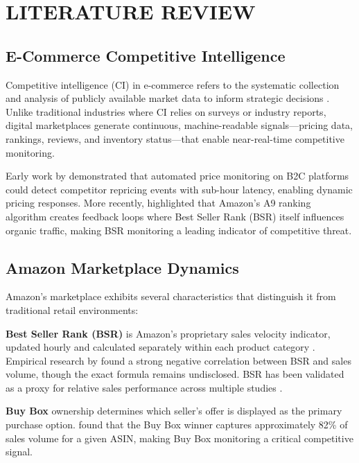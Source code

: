 \chapter{LITERATURE REVIEW}

\section{E-Commerce Competitive Intelligence}

Competitive intelligence (CI) in e-commerce refers to the systematic collection and
analysis of publicly available market data to inform strategic decisions \cite{gilad1986}.
Unlike traditional industries where CI relies on surveys or industry reports, digital
marketplaces generate continuous, machine-readable signals—pricing data, rankings,
reviews, and inventory status—that enable near-real-time competitive monitoring.

Early work by \cite{chen2010} demonstrated that automated price monitoring on B2C
platforms could detect competitor repricing events with sub-hour latency, enabling
dynamic pricing responses. More recently, \cite{liu2023marketplace} highlighted that
Amazon's A9 ranking algorithm creates feedback loops where Best Seller Rank (BSR)
itself influences organic traffic, making BSR monitoring a leading indicator of
competitive threat.

\section{Amazon Marketplace Dynamics}

Amazon's marketplace exhibits several characteristics that distinguish it from
traditional retail environments:

\textbf{Best Seller Rank (BSR)} is Amazon's proprietary sales velocity indicator,
updated hourly and calculated separately within each product category
\cite{amazon2024bsr}. Empirical research by \cite{chevalier2006} found a strong
negative correlation between BSR and sales volume, though the exact formula remains
undisclosed. BSR has been validated as a proxy for relative sales performance across
multiple studies \cite{sopadjieva2017}.

\textbf{Buy Box} ownership determines which seller's offer is displayed as the primary
purchase option. \cite{chen2016buybox} found that the Buy Box winner captures
approximately 82\% of sales volume for a given ASIN, making Buy Box monitoring a
critical competitive signal.

